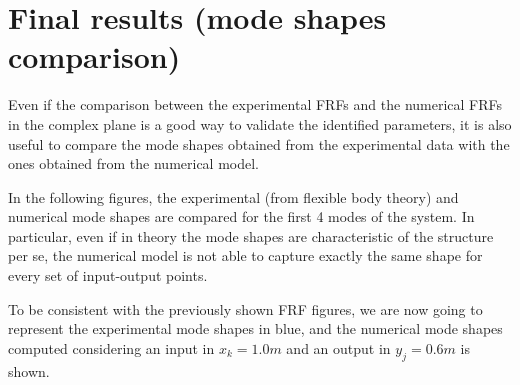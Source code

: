 \section{Final results (mode shapes comparison)}
\label{sec:final_results_A}

Even if the comparison between the experimental FRFs and the numerical FRFs in the complex plane is a good way to validate the identified parameters, it is also useful to compare the mode shapes obtained from the experimental data with the ones obtained from the numerical model.

In the following figures, the experimental (from flexible body theory) and numerical mode shapes are compared for the first 4 modes of the system.
In particular, even if in theory the mode shapes are characteristic of the structure per se, the numerical model is not able to capture exactly the same shape for every set of input-output points.

To be consistent with the previously shown FRF figures, we are now going to represent the experimental mode shapes in blue, and the numerical mode shapes computed considering an input in $x_k = 1.0m$ and an output in $y_j = 0.6m$ is shown.

